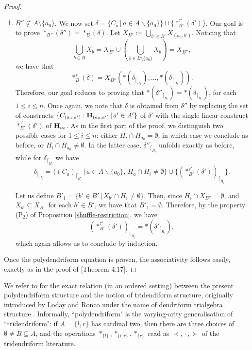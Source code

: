\documentclass{article}
\theoremstyle{plain}
\theoremstyle{definition}
\newcommand{\inc}{\subseteq}
\newcommand{\union}{\cup}
\newcommand{\Union}{\bigcup}
\newcommand{\set}[1]{\{#1\}}
\newcommand{\bcdot}{\,{\bm \cdot}\,}
\begin{document}
\begin{proof}
\begin{enumerate}
  
\item $B''\not\inc A\setminus\set{a_0}$. We now set 
$\delta=\{C_a\,|\,a\in A\backslash\{a_0\}\}\cup\{\ast^{\tau'}_{B'}(\delta')\}$. Our goal is to prove $\ast_{B''}(\delta'')=\ast_{B}(\delta)$. Let $X_{B'}:=\Union_{b'\in B'}X_{(a_0,b')}$.  Noticing that  
$$\Union_{b\in B}X_b=X_{B'}\union(\Union_{b\in B\setminus\set{a_0}}X_b)=X_{B''},$$ we have that
$$\ast^\tau_B(\delta)=X_{B''}(\ast(\delta_{\lceil_{H_1}}),\dots,\ast(\delta_{\lceil_{H_n}})).$$
Therefore, our goal reduces to proving that $\ast({\delta''}_{\lceil_{H_i}})=\ast(\delta_{\lceil_{H_i}})$, for each $1\leq i\leq n$. Once again, we note that $\delta$ is obtained from $\delta''$ by replacing the set of  constructs $\{C_{(a_0,a')}:{\bf H}_{(a_0,a')}\,|\, a'\in A'\}$ of $\delta'$ with the single linear construct $\ast_{B'}^{\tau'}(\delta')$ of ${\bf H}_{a_0}$.  As in the first part of the proof, we distinguish  two possible cases for $1\leq i\leq n$: either $H_i\cap H_{a_0}=\emptyset$, in which case we conclude as before,  or  $H_i\cap H_{a_0}\neq\emptyset$.  In the latter case, ${\delta''}_{\lceil_{H_i}}$ unfolds exactly as before, while for $\delta_{\lceil_{H_i}}$ we have 
$$\delta_{\lceil_{H_i}}=\{{(C_a)}_{\lceil_{H_i}}\,|\,a\in A\backslash\{a_0\},\, H_a\cap H_i\neq \emptyset\}\cup \{(\ast_{B'}^{\tau'}(\delta'))_{\lceil_{H_i}}\}.$$

 Let us define $B'_1=\{b'\in B'\,|\, X_{b'}\cap H_i\neq\emptyset\}$.  Then, since $H_i\cap X_{B''}=\emptyset$, and $X_{b'}\subseteq X_{B''}$ for each $b'\in B'$, we have that $B'_1=\emptyset$. Therefore, by the property (P$_2$)  of Proposition \ref{shuffle-restriction},  we have
$$(\ast_{B'}^{\tau'}(\delta'))_{\lceil_{H_i}}=\ast({\delta'}_{\lceil_{H_i}}),$$
which again allows us to conclude by induction. 
 \end{enumerate}
Once the polydendriform equation is proven, the associativity follows easily, exactly as in the proof of \cite{PLBJ1}[Theorem 4.17].
\end{proof}

We refer to  \cite[Proposition 4.18]{PLBJ1} for the  exact relation (in an ordered setting) between the present polydendriform structure and the notion of  tridendiform structure, originally introduced by Loday and Ronco under the name of dendriform trialgebra structure \cite{LR-tri}. Informally, ``polydendriform" is the varying-arity generalisation of ``tridendriform":  if $A=\set{l,r}$ has cardinal two, then there are three choices of $\emptyset\neq B\subseteq A$,
and the operations $\ast_{\set{l}}, \ast_{\set{l,r}}, \ast_{\set{r}}$  read as $\prec, \bcdot,\succ$ of the tridendriform literature.
 
\end{document}
